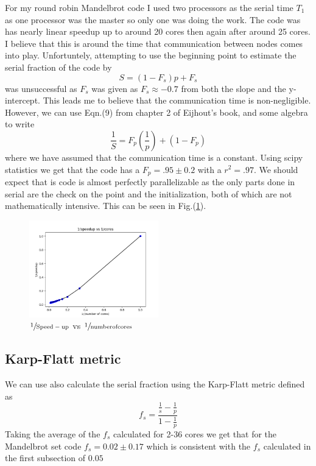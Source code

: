 \documentclass[12pt]{article}
\theoremstyle{plain}
\theoremstyle{definition}
\begin{document}
For my round robin Mandelbrot code I used two processors as the serial time $T_1$ as one processor was the master so only one was doing the work. The code was has nearly linear speedup up to around 20 cores then again after around 25 cores. I believe that this is around the time that communication between nodes comes into play. Unfortuntely, attempting to use the beginning point to estimate the serial fraction of the code by 
\begin{equation}
S = (1-F_s)p + F_s
\end{equation} 
was unsuccessful as $F_s$ was given as $F_s \approx -0.7$ from both the slope and the y-intercept. This leads me to believe that the communication time is non-negligible. However, we can use Eqn.(9) from chapter 2 of Eijhout's book, and some algebra to write
\begin{equation}
\frac{1}{S} = F_p (\frac{1}{p}) + (1-F_p)
\label{eqn:inverse}
\end{equation}  
where we have assumed that the communication time is a constant. Using scipy statistics we get that the code has a $F_p = .95 \pm 0.2$ with a $r^2 = .97$. We should expect that is code is almost perfectly parallelizable as the only parts done in serial are the check on the point and the initialization, both of which are not mathematically intensive. This can be seen in Fig.(\ref{fig:inverse1a}).
\begin{figure}
        \includegraphics[width=0.5\textwidth]{inverseq1_strong.png}
        \caption{$\sfrac{1}{\mathrm{Speed-up}}$ vs $\sfrac{1}{\mathrm{number of cores}}$}
        \label{fig:inverse1a}
\end{figure}

 
\subsection{Karp-Flatt metric}
We can use also calculate the serial fraction using the Karp-Flatt metric defined as 
\begin{equation}
f_s = \frac{\frac{1}{s}-\frac{1}{p}}{1-\frac{1}{p}}
\end{equation}
Taking the average of the $f_s$ calculated for 2-36 cores we get that for the Mandelbrot set code $f_s = 0.02 \pm 0.17$ which is consistent with the $f_s$ calculated in the first subsection of $0.05$
\end{document}
